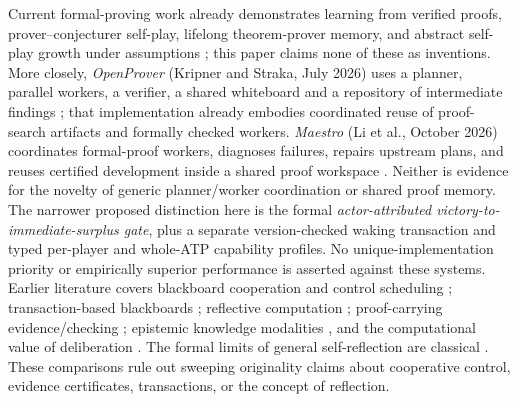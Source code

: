 \documentclass[11pt,letterpaper]{article}
\theoremstyle{definition}
\theoremstyle{plain}
\theoremstyle{definition}
\begin{document}
Current formal-proving work already demonstrates learning from verified proofs, prover--conjecturer self-play, lifelong theorem-prover memory, and abstract self-play growth under assumptions \cite{alphaproof,stp,leanagent,selfplaytheory}; this paper claims none of these as inventions. More closely, \emph{OpenProver} (Kripner and Straka, July 2026) uses a planner, parallel workers, a verifier, a shared whiteboard and a repository of intermediate findings \cite{openprover}; that implementation already embodies coordinated reuse of proof-search artifacts and formally checked workers. \emph{Maestro} (Li et al., October 2026) coordinates formal-proof workers, diagnoses failures, repairs upstream plans, and reuses certified development inside a shared proof workspace \cite{maestro}. Neither is evidence for the novelty of generic planner/worker coordination or shared proof memory. The narrower proposed distinction here is the formal \emph{actor-attributed victory-to-immediate-surplus gate}, plus a separate version-checked waking transaction and typed per-player and whole-ATP capability profiles. No unique-implementation priority or empirically superior performance is asserted against these systems. Earlier literature covers blackboard cooperation and control scheduling \cite{hayes,nii}; transaction-based blackboards \cite{transboard}; reflective computation \cite{smith}; proof-carrying evidence/checking \cite{necula}; epistemic knowledge modalities \cite{fagin}, and the computational value of deliberation \cite{russell}. The formal limits of general self-reflection are classical \cite{godel-sep}. These comparisons rule out sweeping originality claims about cooperative control, evidence certificates, transactions, or the concept of reflection.
\end{document}

